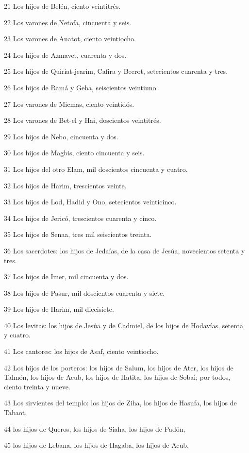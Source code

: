 \par 21 Los hijos de Belén, ciento veintitrés.
\par 22 Los varones de Netofa, cincuenta y seis.
\par 23 Los varones de Anatot, ciento veintiocho.
\par 24 Los hijos de Azmavet, cuarenta y dos.
\par 25 Los hijos de Quiriat-jearim, Cafira y Beerot, setecientos cuarenta y tres.
\par 26 Los hijos de Ramá y Geba, seiscientos veintiuno.
\par 27 Los varones de Micmas, ciento veintidós.
\par 28 Los varones de Bet-el y Hai, doscientos veintitrés.
\par 29 Los hijos de Nebo, cincuenta y dos.
\par 30 Los hijos de Magbis, ciento cincuenta y seis.
\par 31 Los hijos del otro Elam, mil doscientos cincuenta y cuatro.
\par 32 Los hijos de Harim, trescientos veinte.
\par 33 Los hijos de Lod, Hadid y Ono, setecientos veinticinco.
\par 34 Los hijos de Jericó, trescientos cuarenta y cinco.
\par 35 Los hijos de Senaa, tres mil seiscientos treinta.
\par 36 Los sacerdotes: los hijos de Jedaías, de la casa de Jesúa, novecientos setenta y tres.
\par 37 Los hijos de Imer, mil cincuenta y dos.
\par 38 Los hijos de Pasur, mil doscientos cuarenta y siete.
\par 39 Los hijos de Harim, mil diecisiete.
\par 40 Los levitas: los hijos de Jesúa y de Cadmiel, de los hijos de Hodavías, setenta y cuatro.
\par 41 Los cantores: los hijos de Asaf, ciento veintiocho.
\par 42 Los hijos de los porteros: los hijos de Salum, los hijos de Ater, los hijos de Talmón, los hijos de Acub, los hijos de Hatita, los hijos de Sobai; por todos, ciento treinta y nueve.
\par 43 Los sirvientes del templo: los hijos de Ziha, los hijos de Hasufa, los hijos de Tabaot,
\par 44 los hijos de Queros, los hijos de Siaha, los hijos de Padón,
\par 45 los hijos de Lebana, los hijos de Hagaba, los hijos de Acub,
